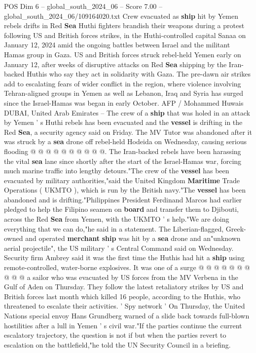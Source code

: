 \begin{textsample}{POS Dim 6 – global\_south\_2024\_06 – Score 7.00 – global\_south\_2024\_06/109164020.txt}  \label{ex:f6_pos_174}
Crew evacuated as \textbf{ship} hit by Yemen rebels drifts in Red \textbf{Sea} Huthi fighters brandish their weapons during a protest following US and British forces strikes, in the Huthi-controlled capital Sanaa on January 12, 2024 amid the ongoing battles between Israel and the militant Hamas group in Gaza.
US and British forces struck rebel-held Yemen early on January 12, after weeks of disruptive attacks on Red \textbf{Sea} shipping by the Iran-backed Huthis who say they act in solidarity with Gaza.
The pre-dawn air strikes add to escalating fears of wider conflict in the region, where violence involving Tehran-aligned groups in Yemen as well as Lebanon, Iraq and Syria has surged since the Israel-Hamas was began in early October.
AFP / Mohammed Huwais DUBAI, United Arab Emirates -- The crew of a \textbf{ship} that was holed in an attack by Yemen ' s Huthi rebels has been evacuated and the \textbf{vessel} is drifting in the Red \textbf{Sea}, a security agency said on Friday.
The MV Tutor was abandoned after it was struck by a \textbf{sea} drone off rebel-held Hodeida on Wednesday, causing serious flooding @ @ @ @ @ @ @ @ @ @.
The Iran-backed rebels have been harassing the vital \textbf{sea} lane since shortly after the start of the Israel-Hamas war, forcing much marine traffic into lengthy detours."The crew of the \textbf{vessel} has been evacuated by military authorities,"said the United Kingdom \textbf{Maritime} Trade Operations ( UKMTO ), which is run by the British navy."The \textbf{vessel} has been abandoned and is drifting."Philippines President Ferdinand Marcos had earlier pledged to help the Filipino seamen on \textbf{board} and transfer them to Djibouti, across the Red \textbf{Sea} from Yemen, with the UKMTO ' s help."We are doing everything that we can do,"he said in a statement.
The Liberian-flagged, Greek-owned and operated \textbf{merchant} \textbf{ship} was hit by a \textbf{sea} drone and an"unknown aerial projectile", the US military ' s Central Command said on Wednesday.
Security firm Ambrey said it was the first time the Huthis had hit a \textbf{ship} using remote-controlled, water-borne explosives.
It was one of a surge @ @ @ @ @ @ @ @ @ @ a sailor who was evacuated by US forces from the MV Verbena in the Gulf of Aden on Thursday.
They follow the latest retaliatory strikes by US and British forces last month which killed 16 people, according to the Huthis, who threatened to escalate their activities. ' Spy network ' On Thursday, the United Nations special envoy Hans Grundberg warned of a slide back towards full-blown hostilities after a lull in Yemen ' s civil war."If the parties continue the current escalatory trajectory, the question is not if but when the parties revert to escalation on the battlefield,"he told the UN Security Council in a briefing.

\end{textsample}
